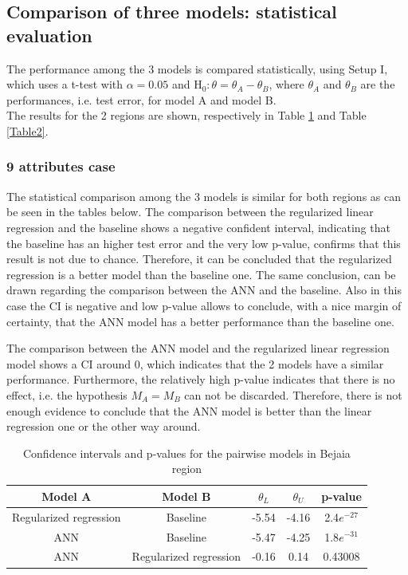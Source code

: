 \documentclass[10pt]{article}
\numberwithin{equation}{section}
\numberwithin{figure}{section}
\numberwithin{table}{section}
\begin{document}
\subsection{Comparison of three models: statistical evaluation}

The performance among the 3 models is compared statistically, using Setup I, which uses a t-test with $\alpha = 0.05$ and H$_0: \theta = \theta_A - \theta_B $, where $\theta_A$ and $\theta_B$ are the performances, i.e. test error, for model A and model B.\\

The results for the 2 regions are shown, respectively in Table \ref{Table1} and Table \ref{Table2}. 

\subsubsection{9 attributes case}

The statistical comparison among the 3 models is similar for both regions as can be seen in the tables below.
The comparison between the regularized linear regression and the baseline shows a negative confident interval, indicating that the baseline has an higher test error and the very low p-value, confirms that this result is not due to chance. 
Therefore, it can be concluded that the regularized regression is a better model than the baseline one.
The same conclusion, can be drawn regarding the comparison between the ANN and the baseline. Also in this case the CI is negative and low p-value allows to conclude, with a nice margin of certainty, that the ANN model has a better performance than the baseline one.

The comparison between the ANN model and the regularized linear regression model shows a CI around 0, which indicates that the 2 models have a similar performance. Furthermore, the relatively high p-value indicates that there is no effect, i.e. the hypothesis $M_A = M_B$ can not be discarded. Therefore, there is not enough evidence to conclude that the ANN model is better than the linear regression one or the other way around.

\begin{table}[H]
\centering
\begin{tabular}{|c|c|c|c|c|} \hline
\textbf{Model A}  & \textbf{Model B}  & \textbf{$\theta_L$} & \textbf{$\theta_U$} & \textbf{p-value} \\ \hline
Regularized regression & Baseline          & -5.54               & -4.16               & 2.4$e^{-27}$     \\ \hline
ANN               & Baseline          & -5.47               & -4.25              & 1.8$e^{-31}$     \\ \hline
ANN               & Regularized regression & -0.16              & 0.14               & 0.43008    \\ \hline
\end{tabular}
\caption{Confidence intervals and p-values for the pairwise models in Bejaia region}
\label{Table1}
\end{table}
\end{document}
